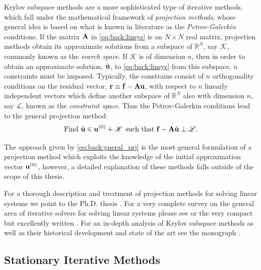 Krylov subspace methods are a more sophisticated type of iterative methods,
which fall under the mathematical framework of \textit{projection methods},
whose general idea is based on what is known in literature as the
\textit{Petrov-Galerkin} conditions. If the matrix $\mathbf{A}$ in
\eqref{eq:back:linsys} is an $N\times N$ real matrix, projection methods obtain
its approximate solutions from a subspace of $\mathbb{R}^{N}$, say $\mathscr{K}$, commonly known as the \emph{search space}.
If $\mathscr{K}$ is of dimension $n$, then in order to obtain an approximate
solution, $\hat{\mathbf{u}}$, to \eqref{eq:back:linsys} from this subspace, $n$
constraints must be imposed. Typically, the constrains consist of $n$ orthogonality conditions on the residual vector, $\mathbf{r}\equiv\mathbf{f}-\mathbf{A}\mathbf{u}$,
 with respect to $n$ linearly independent vectors which define another subspace of $\mathbb{R}^{N}$ also with dimension $n$, say $\mathscr{L}$, known as the
\textit{constraint space}. Thus the Petrov-Galerkin conditions lead to the general projection method:
\begin{equation}
\text{Find } \hat{\mathbf{u}}\in\mathbf{u}^{(0)}+\mathscr{K}\text{ such that } \mathbf{f}-\mathbf{A}\hat{\mathbf{u}}\perp\mathscr{L}.
\label{eq:back:gneral_prj}
\end{equation}

The approach given by \eqref{eq:back:gneral_prj} is the most general formulation of a projection method which exploits the knowledge of the initial approximation vector $\mathbf{u}^{(0)}$, however, a detailed explanation of these methods falls outside of the scope of this thesis.

For a thorough description and treatment of projection methods for solving linear systems we point to the Ph.D. thesis \cite{Gaul14}. For a very complete survey on the general area of iterative solvers for solving linear systems please see \cite{Saa03} or the very compact but excellently written \cite{Gre97}. For an in-depth analysis of Krylov subspace methods as well as their historical development and state of the art see the monograph \cite{LieStr12}.

\subsection{Stationary Iterative Methods}
\label{back:itersolvers:class_sol}


